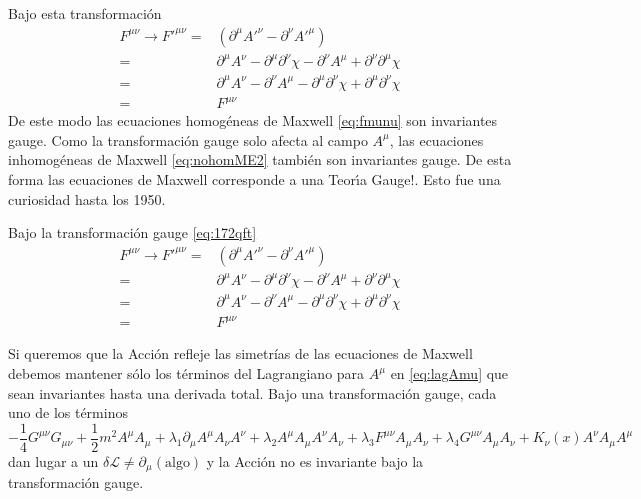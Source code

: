 Bajo esta transformaci\'on
\begin{align}
  \label{eq:fmunutrans}
  F^{\mu\nu}\to{F'}^{\mu\nu}=&(\partial^\mu{A'}^\nu-\partial^\nu{A'}^\mu)\nonumber\\
  =&\partial^\mu A^\nu-\partial^\mu\partial^\nu\chi-\partial^\nu A^\mu+\partial^\nu\partial^\mu\chi\nonumber\\
  =&\partial^\mu A^\nu-\partial^\nu A^\mu-\partial^\mu\partial^\nu\chi+\partial^\mu\partial^\nu\chi\nonumber\\
  =&F^{\mu\nu}
\end{align}
De este modo las ecuaciones homog\'eneas de Maxwell \eqref{eq:fmunu} son invariantes gauge. Como la transformaci\'on gauge solo afecta al campo $A^\mu$, las ecuaciones inhomog\'eneas de Maxwell \eqref{eq:nohomME2} tambi\'en son invariantes gauge. 
De esta forma las ecuaciones de Maxwell corresponde a una Teor\'\i a Gauge!. Esto fue una curiosidad hasta los 1950. 




\begin{frame}
Bajo la transformación gauge \eqref{eq:172qft}
\begin{align}
  \label{eq:fmunutrans}
  F^{\mu\nu}\to{F'}^{\mu\nu}=&(\partial^\mu{A'}^\nu-\partial^\nu{A'}^\mu)\nonumber\\
  =&\partial^\mu A^\nu-\partial^\mu\partial^\nu\chi-\partial^\nu A^\mu+\partial^\nu\partial^\mu\chi\nonumber\\
  =&\partial^\mu A^\nu-\partial^\nu A^\mu-\partial^\mu\partial^\nu\chi+\partial^\mu\partial^\nu\chi\nonumber\\
  =&F^{\mu\nu}
\end{align}

Si queremos que la Acción refleje las simetrías de las ecuaciones de
Maxwell debemos mantener sólo los términos del Lagrangiano para $A^\mu$
en \eqref{eq:lagAmu} que sean invariantes hasta una derivada total. Bajo una transformación gauge, cada
uno de los términos
\begin{equation*}
  -\frac{1}{4}G^{\mu\nu}G_{\mu\nu}+
  \frac{1}{2}m^2A^\mu A_\mu+\lambda_1\partial_\mu A^\mu A_\nu A^\nu+\lambda_2 A^\mu A_\mu A^\nu A_\nu+\lambda_3F^{\mu\nu}A_\mu A_\nu+\lambda_4G^{\mu\nu}A_\mu A_\nu
+K_\nu(x) A^\nu A_\mu A^\mu
\end{equation*}
dan lugar a un $\delta\mathcal{L}\neq\partial_\mu(\text{algo})$ y la Acción no es
invariante bajo la transformación gauge.

\end{frame}


